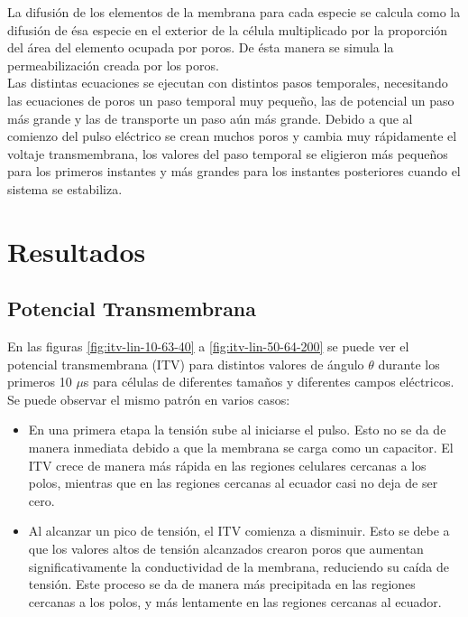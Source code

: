 \documentclass[a4paper,10pt]{article}
\begin{document}
La difusión de los elementos de la membrana para cada especie se calcula como la difusión de ésa especie en el exterior de la célula multiplicado por la proporción del área del elemento ocupada por poros. De ésta manera se simula la permeabilización creada por los poros.\\

Las distintas ecuaciones se ejecutan con distintos pasos temporales, necesitando las ecuaciones de poros un paso temporal muy pequeño, las de potencial un paso más grande y las de transporte un paso aún más grande. Debido a que al comienzo del pulso eléctrico se crean muchos poros y cambia muy rápidamente el voltaje transmembrana, los valores del paso temporal se eligieron más pequeños para los primeros instantes y más grandes para los instantes posteriores cuando el sistema se estabiliza.\\


\newpage
\section{Resultados}

\subsection{Potencial Transmembrana}


En las figuras \ref{fig:itv-lin-10-63-40} a \ref{fig:itv-lin-50-64-200} se puede ver el potencial transmembrana (ITV) para distintos valores de ángulo $\theta$ durante los primeros 10 $\mu$s para células de diferentes tamaños y diferentes campos eléctricos. Se puede observar el mismo patrón en varios casos:
\begin{itemize}
	\item En una primera etapa la tensión sube al iniciarse el pulso. Esto no se da de manera inmediata debido a que la membrana se carga como un capacitor. El ITV crece de manera más rápida en las regiones celulares cercanas a los polos, mientras que en las regiones cercanas al ecuador casi no deja de ser cero.
	\item Al alcanzar un pico de tensión, el ITV comienza a disminuir. Esto se debe a que los valores altos de tensión alcanzados crearon poros que aumentan significativamente la conductividad de la membrana, reduciendo su caída de tensión. Este proceso se da de manera más precipitada en las regiones cercanas a los polos, y más lentamente en las regiones cercanas al ecuador. 
\end{itemize}
\end{document}
